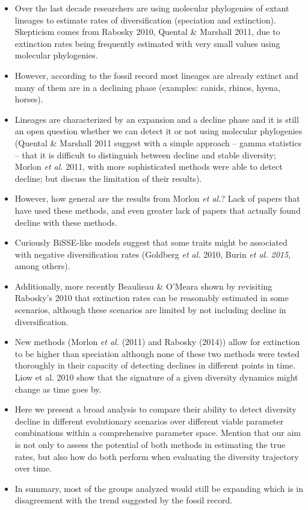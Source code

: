 \documentclass[12pt,]{article}
\begin{document}
\begin{itemize}
\item
  Over the last decade researchers are using molecular phylogenies of
  extant lineages to estimate rates of diversification (speciation and
  extinction). Skepticism comes from Rabosky 2010, Quental \& Marshall
  2011, due to extinction rates being frequently estimated with very
  small values using molecular phylogenies.
\item
  However, according to the fossil record most lineages are already
  extinct and many of them are in a declining phase (examples: canids,
  rhinos, hyena, horses).
\item
  Lineages are characterized by an expansion and a decline phase and it
  is still an open question whether we can detect it or not using
  molecular phylogenies (Quental \& Marshall 2011 suggest with a simple
  approach -- gamma statistics -- that it is difficult to distinguish
  between decline and stable diversity; Morlon \emph{et al.} 2011, with
  more sophisticated methods were able to detect decline; but discuss
  the limitation of their results).
\item
  However, how general are the results from Morlon \emph{et al.}? Lack
  of papers that have used these methods, and even greater lack of
  papers that actually found decline with these methods.
\item
  Curiously BiSSE-like models suggest that some traits might be
  associated with negative diversification rates (Goldberg \emph{et al.}
  2010, Burin \emph{et al. 2015}, among others).
\item
  Additionally, more recently Beaulieau \& O'Meara shown by revisiting
  Rabosky's 2010 that extinction rates can be reasonably estimated in
  some scenarios, although these scenarios are limited by not including
  decline in diversification.
\item
  New methods (Morlon \emph{et al.} (2011) and Rabosky (2014)) allow for
  extinction to be higher than speciation although none of these two
  methods were tested thoroughly in their capacity of detecting declines
  in different points in time. Liow et al. 2010 show that the signature
  of a given diversity dynamics might change as time goes by.
\item
  Here we present a broad analysis to compare their ability to detect
  diversity decline in different evolutionary scenarios over different
  viable parameter combinations within a comprehensive parameter space.
  Mention that our aim is not only to assess the potential of both
  methods in estimating the true rates, but also how do both perform
  when evaluating the diversity trajectory over time.
\item
  In summary, most of the groups analyzed would still be expanding which
  is in disagreement with the trend suggested by the fossil record.
\end{itemize}
\end{document}
